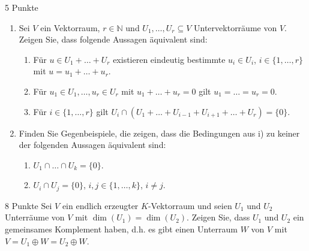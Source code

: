 \documentclass{../problemset}
\author{Michael van Straten}
\begin{document}
\maketitle

\begin{problem}{5 Punkte}
\begin{enumerate}
	\item Sei $V$ ein Vektorraum, $r \in \mathbb{N}$ und $U_1, \ldots, U_r \subseteq V$ Untervektorräume von $V$. Zeigen Sie, dass folgende Aussagen äquivalent sind:
	      \begin{enumerate}
		      \item Für $u \in U_1 + \ldots + U_r$ existieren eindeutig bestimmte $u_i \in U_i$, $i \in \{1, \ldots, r\}$ mit $u = u_1 + \ldots + u_r$.
		      \item Für $u_1 \in U_1, \ldots, u_r \in U_r$ mit $u_1 + \ldots + u_r = 0$ gilt $u_1 = \ldots = u_r = 0$.
		      \item Für $i \in \{1, \ldots, r\}$ gilt $U_i \cap (U_1 + \ldots + U_{i-1} + U_{i+1} + \ldots + U_r) = \{0\}$.
	      \end{enumerate}
	\item Finden Sie Gegenbeispiele, die zeigen, dass die Bedingungen aus i) zu keiner der folgenden Aussagen äquivalent sind:
	      \begin{multicols}{2}
		      \begin{enumerate}[start=4]
			      \item $U_1 \cap \ldots \cap U_k = \{0\}$.
			      \item $U_i \cap U_j = \{0\}$, $i, j \in \{1, \ldots, k\}$, $i \neq j$.
		      \end{enumerate}
	      \end{multicols}
\end{enumerate}
\end{problem}

\begin{problem}{8 Punkte}
Sei $V$ ein endlich erzeugter $K$-Vektorraum und seien $U_1$ und $U_2$ Unterräume von $V$ mit $\dim(U_1) = \dim(U_2)$. Zeigen Sie, dass $U_1$ und $U_2$ ein gemeinsames Komplement haben, d.h. es gibt einen Unterraum $W$ von $V$ mit $V = U_1 \oplus W = U_2 \oplus W$.
\end{problem}
\end{document}
